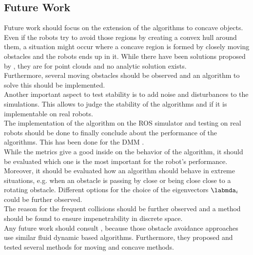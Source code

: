 \subsection{Future Work}
Future work should focus on the extension of the algorithms to concave objects. Even if the robots try to avoid those regions by creating a convex hull around them, a situation might occur where a concave region is formed by closely moving obstacles and the robots ends up in it. While there have been solutions proposed by \cite{saveriano2013point,}, they are for point clouds and no analytic solution exists.\\
Furthermore, several moving obstacles should be observed and an algorithm to solve this should be implemented. \\
Another important aspect to test stability is to add  noise and disturbances to the simulations. This allows to judge the stability of the algorithms and if it is implementable on real robots. \\
The implementation of the algorithm on the ROS simulator and testing on real robots should be done to finally conclude about the performance of the algorithms. This has been done for the DMM \cite{khansari2012dynamical}. \\
While the metrics give a good inside on the behavior of the algorithm, it should be evaluated which one is the most important for the robot's performance. Moreover, it should be evaluated how an algorithm should behave in extreme situations, e.g. when an obstacle is passing by close or being close close to a rotating obstacle.
Different options for the choice of the eigenvectors $\labmda_i$ could be further observed. \\
The reason for the frequent collisions should be further observed and a method should be found to ensure impenetrability in discrete space. \\
Any future work should consult \cite{feder1997real,khansari2012realtime,khansari2012dynamical,saveriano2013point,saveriano2014distance,}, because those obstacle avoidance approaches use similar fluid dynamic based algorithms. Furthermore, they proposed and tested several methods for moving and concave methods.

